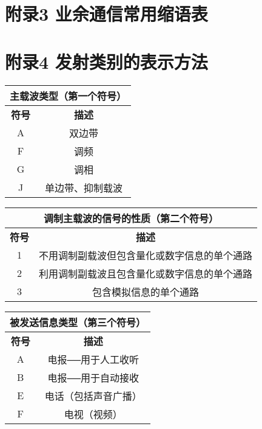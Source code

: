 \newpage



\section{附录3 业余通信常用缩语表}

\newpage

\section{附录4 发射类别的表示方法}

\begin{tabular}{|c|c|}
	\hline
	\multicolumn{2}{|c|}{\textbf{主载波类型（第一个符号）}} \\
	\hline
	\textbf{符号} & \textbf{描述} \\
	\hline
	A & 双边带 \\
	\hline
	F & 调频 \\
	\hline
	G & 调相 \\
	\hline
	J & 单边带、抑制载波 \\
	\hline
\end{tabular}

\bigskip

\begin{tabular}{|c|c|}
	\hline
	\multicolumn{2}{|c|}{\textbf{调制主载波的信号的性质（第二个符号）}} \\
	\hline
	\textbf{符号} & \textbf{描述} \\
	\hline
	1 & 不用调制副载波但包含量化或数字信息的单个通路 \\
	\hline
	2 & 利用调制副载波且包含量化或数字信息的单个通路 \\
	\hline
	3 & 包含模拟信息的单个通路 \\
	\hline
\end{tabular}

\bigskip

\begin{tabular}{|c|c|}
	\hline
	\multicolumn{2}{|c|}{\textbf{被发送信息类型（第三个符号）}} \\
	\hline
	\textbf{符号} & \textbf{描述} \\
	\hline
	A & 电报──用于人工收听 \\
	\hline
	B & 电报──用于自动接收 \\
	\hline
	E & 电话（包括声音广播） \\
	\hline
	F & 电视（视频） \\
	\hline
\end{tabular}


